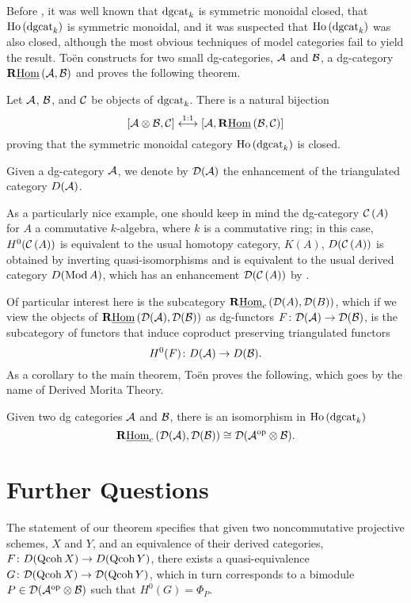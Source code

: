 \documentclass[reqno, 12pt]{amsart}
\begin{document}
Before \cite{Toen}, it was well known that $\operatorname{dgcat}_k$ is symmetric monoidal closed, that $\operatorname{Ho}\left(\operatorname{dgcat}_k\right)$ is symmetric monoidal, and it was suspected that $\operatorname{Ho}\left(\operatorname{dgcat}_k\right)$ was also closed, although the most obvious techniques of model categories fail to yield the result.
To\"en constructs for two small dg-categories, $\mathcal{A}$ and $\mathcal{B}$, a dg-category $\mathbf{R}\underline{\operatorname{Hom}}\left(\mathcal{A},\mathcal{B}\right)$ and proves the following theorem.
\begin{theorem} \label{theorem: Toen}
  Let $\mathcal{A}$, $\mathcal{B}$, and $\mathcal{C}$ be objects of $\operatorname{dgcat}_k$.
  There is a natural bijection
  $$[\mathcal{A} \otimes \mathcal{B}, \mathcal{C}] \overset{1:1}\longleftrightarrow [\mathcal{A}, \mathbf{R}\underline{\operatorname{Hom}}\left(\mathcal{B},\mathcal{C}\right)]$$
  proving that the symmetric monoidal category $\operatorname{Ho}\left(\operatorname{dgcat}_k\right)$ is closed.
\end{theorem}

Given a dg-category $\mathcal{A}$, we denote by $\mathcal{D}(\mathcal{A})$ the enhancement of the triangulated category $D(\mathcal{A})$.

\begin{example}
  As a particularly nice example, one should keep in mind the dg-category $\mathcal{C}\left(A\right)$ for $A$ a commutative $k$-algebra, where $k$ is a commutative ring; in this case, $H^0(\mathcal{C}\left(A\right))$ is equivalent to the usual homotopy category, $K(A)$, $D(\mathcal{C}\left(A\right))$ is obtained by inverting quasi-isomorphisms and is equivalent to the usual derived category $D(\operatorname{Mod}A)$, which has an enhancement $\mathcal{D}(\mathcal{C}\left(A\right))$ by \cite{Lunts Orlov}.
\end{example}
Of particular interest here is the subcategory $\mathbf{R}\underline{\operatorname{Hom}}_c\left(\mathcal{D}(A),\mathcal{D}(B)\right)$, which if we view the objects of $\mathbf{R}\underline{\operatorname{Hom}}\left(\mathcal{D}(\mathcal{A}),\mathcal{D}(\mathcal{B})\right)$ as dg-functors $F \colon \mathcal{D}(\mathcal{A}) \to \mathcal{D}(\mathcal{B})$, is the subcategory of functors that induce coproduct preserving triangulated functors
$$H^0(F) \colon D(\mathcal{A}) \to D(\mathcal{B}).$$
As a corollary to the main theorem, To\"en proves the following, which goes by the name of Derived Morita Theory.
\begin{corollary} \label{corollary: Toen}
  Given two dg categories $\mathcal{A}$ and $\mathcal{B}$, there is an isomorphism in $\operatorname{Ho}\left(\operatorname{dgcat}_k\right)$
  $$\mathbf{R}\underline{\operatorname{Hom}}_c\left(\mathcal{D}(\mathcal{A}), \mathcal{D}(\mathcal{B})\right) \cong \mathcal{D}(\mathcal{A}^{\operatorname{op}} \otimes \mathcal{B}).$$
\end{corollary}

\section{Further Questions}
The statement of our theorem specifies that given two noncommutative projective schemes, $X$ and $Y$, and an equivalence of their derived categories, $F \colon D(\operatorname{Qcoh}X) \to D(\operatorname{Qcoh}Y)$, there exists a quasi-equivalence $G \colon \mathcal{D}(\operatorname{Qcoh}X) \to \mathcal{D}(\operatorname{Qcoh}Y)$, which in turn corresponds to a bimodule $P \in \mathcal{D}(\mathcal{A}^{\operatorname{op}} \otimes \mathcal{B})$ such that $H^0(G) = \Phi_P$.
\end{document}
